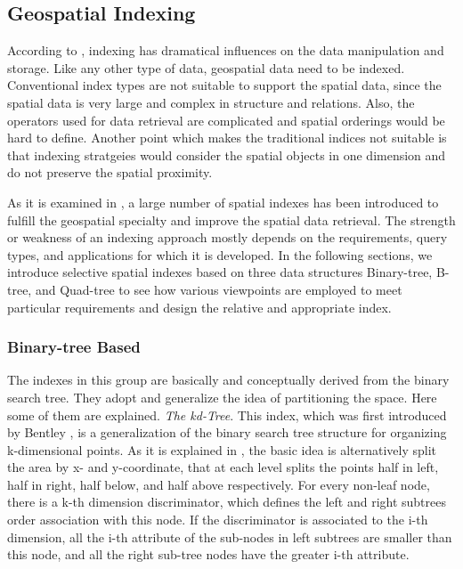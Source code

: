 \documentclass[a4paper,12pt]{article}
\begin{document}
\subsection{Geospatial Indexing}
\label{s.geospatial-index}
According to \cite{survey}, indexing has dramatical influences on the data manipulation and storage. Like any other type of data, geospatial data need to be indexed. Conventional index types are not suitable to support the spatial data, since the spatial data is very large and complex in structure and relations. Also, the operators used for data retrieval are complicated and spatial orderings would be hard to define. Another point which makes the traditional indices not suitable is that indexing stratgeies would consider the spatial objects in one dimension and do not preserve the spatial proximity.

As it is examined in \cite{survey}, a large number of spatial indexes has been introduced to fulfill the geospatial specialty and improve the spatial data retrieval. The strength or weakness of an indexing approach mostly depends on the requirements, query types, and applications for which it is developed. In the following sections, we introduce selective spatial indexes based on three data structures Binary-tree, B-tree, and Quad-tree to see how various viewpoints are employed to meet particular requirements and design the relative and appropriate index.

\subsubsection{Binary-tree Based}
The indexes in this group are basically and conceptually derived from the binary search tree. They adopt and generalize the idea of partitioning the space. Here some of them are explained.
\emph{The kd-Tree}.
This index, which was first introduced by Bentley \cite{bently1975}, is a generalization of the binary search tree structure for organizing k-dimensional points. As it is explained in \cite{bently1975}, the basic idea is alternatively split the area by x- and y-coordinate, that at each level splits the points half in left, half in right, half below, and half above respectively. For every non-leaf node, there is a k-th dimension discriminator, which defines the left and right subtrees order association with this node. If the discriminator is associated to the i-th dimension, all the i-th attribute of the sub-nodes in left subtrees are smaller than this node, and all the right sub-tree nodes have the greater i-th attribute.
\end{document}
